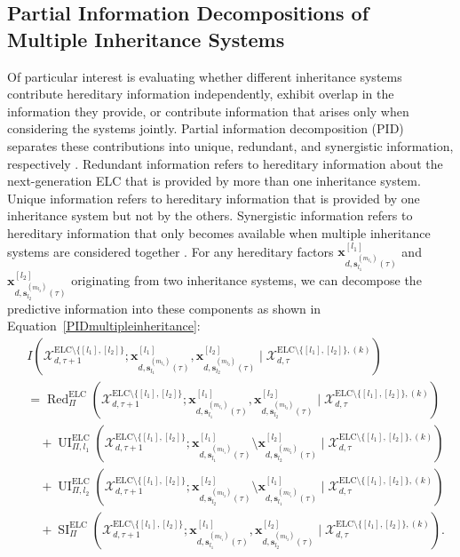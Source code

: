 \documentclass[pdflatex,sn-mathphys-num]{sn-jnl}
\theoremstyle{thmstylethree}
\theoremstyle{thmstyleone}
\begin{document}
\subsection{Partial Information Decompositions of Multiple Inheritance Systems}
Of particular interest is evaluating whether different inheritance systems contribute hereditary information independently, exhibit overlap in the information they provide, or contribute information that arises only when considering the systems jointly. Partial information decomposition (PID) separates these contributions into unique, redundant, and synergistic information, respectively \cite{williams2010nonnegative, kolchinsky2022novel, lyu2026multivariate}. Redundant information refers to hereditary information about the next-generation ELC that is provided by more than one inheritance system. Unique information refers to hereditary information that is provided by one inheritance system but not by the others. Synergistic information refers to hereditary information that only becomes available when multiple inheritance systems are considered together \cite{rama2026developmental}. For any hereditary factors $\mathbf{x}^{[l_1]}_{d,\mathbf{s}^{(m_{l_1})}_{l_1}(\tau)}$ and $\mathbf{x}^{[l_2]}_{d,\mathbf{s}^{(m_{l_2})}_{l_2}(\tau)}$ originating from two inheritance systems, we can decompose the predictive information into these components as shown in Equation~\ref{PIDmultipleinheritance}:
\begin{align}
\label{PIDmultipleinheritance}
&
I\left(
\mathcal{X}^{\mathrm{ELC}\setminus\{[l_1],[l_2]\}}_{d,\tau+1};
\mathbf{x}^{[l_1]}_{d,\mathbf{s}^{(m_{l_1})}_{l_1}(\tau)},
\mathbf{x}^{[l_2]}_{d,\mathbf{s}^{(m_{l_2})}_{l_2}(\tau)}
\mid
\mathcal{X}^{\mathrm{ELC}\setminus\{[l_1],[l_2]\},(k)}_{d,\tau}
\right)
\nonumber\\
&=
\operatorname{Red}^{\mathrm{ELC}}_{\Pi}
\left(
\mathcal{X}^{\mathrm{ELC}\setminus\{[l_1],[l_2]\}}_{d,\tau+1};
\mathbf{x}^{[l_1]}_{d,\mathbf{s}^{(m_{l_1})}_{l_1}(\tau)},
\mathbf{x}^{[l_2]}_{d,\mathbf{s}^{(m_{l_2})}_{l_2}(\tau)}
\mid
\mathcal{X}^{\mathrm{ELC}\setminus\{[l_1],[l_2]\},(k)}_{d,\tau}
\right)
\nonumber\\
&\quad+
\operatorname{UI}^{\mathrm{ELC}}_{\Pi,l_1}
\left(
\mathcal{X}^{\mathrm{ELC}\setminus\{[l_1],[l_2]\}}_{d,\tau+1};
\mathbf{x}^{[l_1]}_{d,\mathbf{s}^{(m_{l_1})}_{l_1}(\tau)}
\setminus
\mathbf{x}^{[l_2]}_{d,\mathbf{s}^{(m_{l_2})}_{l_2}(\tau)}
\mid
\mathcal{X}^{\mathrm{ELC}\setminus\{[l_1],[l_2]\},(k)}_{d,\tau}
\right)
\nonumber\\
&\quad+
\operatorname{UI}^{\mathrm{ELC}}_{\Pi,l_2}
\left(
\mathcal{X}^{\mathrm{ELC}\setminus\{[l_1],[l_2]\}}_{d,\tau+1};
\mathbf{x}^{[l_2]}_{d,\mathbf{s}^{(m_{l_2})}_{l_2}(\tau)}
\setminus
\mathbf{x}^{[l_1]}_{d,\mathbf{s}^{(m_{l_1})}_{l_1}(\tau)}
\mid
\mathcal{X}^{\mathrm{ELC}\setminus\{[l_1],[l_2]\},(k)}_{d,\tau}
\right)
\nonumber\\
&\quad+
\operatorname{SI}^{\mathrm{ELC}}_{\Pi}
\left(
\mathcal{X}^{\mathrm{ELC}\setminus\{[l_1],[l_2]\}}_{d,\tau+1};
\mathbf{x}^{[l_1]}_{d,\mathbf{s}^{(m_{l_1})}_{l_1}(\tau)},
\mathbf{x}^{[l_2]}_{d,\mathbf{s}^{(m_{l_2})}_{l_2}(\tau)}
\mid
\mathcal{X}^{\mathrm{ELC}\setminus\{[l_1],[l_2]\},(k)}_{d,\tau}
\right).
\end{align}
\end{document}
